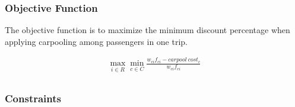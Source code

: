\subsubsection*{Objective Function}

The objective function is to maximize the minimum discount percentage when applying carpooling among passengers in one trip.

\begin{align*}
  \max_{i \in R} \min_{c \in C} \frac{w_{ci} f_{ci} - carpool\ cost_c}{w_{ci} f_{ci}} \tag{IP1} \\
\end{align*}

\subsubsection*{Constraints}

